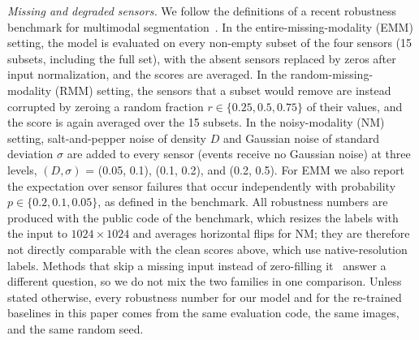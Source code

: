 \emph{Missing and degraded sensors.} We follow the definitions of a recent robustness benchmark for multimodal segmentation~\cite{mmssbench2025}. In the entire-missing-modality (EMM) setting, the model is evaluated on every non-empty subset of the four sensors (15 subsets, including the full set), with the absent sensors replaced by zeros after input normalization, and the scores are averaged. In the random-missing-modality (RMM) setting, the sensors that a subset would remove are instead corrupted by zeroing a random fraction $r\in\{0.25, 0.5, 0.75\}$ of their values, and the score is again averaged over the 15 subsets. In the noisy-modality (NM) setting, salt-and-pepper noise of density $D$ and Gaussian noise of standard deviation $\sigma$ are added to every sensor (events receive no Gaussian noise) at three levels, $(D,\sigma)$ = (0.05, 0.1), (0.1, 0.2), and (0.2, 0.5). For EMM we also report the expectation over sensor failures that occur independently with probability $p\in\{0.2, 0.1, 0.05\}$, as defined in the benchmark. All robustness numbers are produced with the public code of the benchmark, which resizes the labels with the input to $1024\times1024$ and averages horizontal flips for NM; they are therefore not directly comparable with the clean scores above, which use native-resolution labels.
Methods that skip a missing input instead of zero-filling it~\cite{anyseg2024,rmmss2025,fuseadapt2026} answer a different question, so we do not mix the two families in one comparison. Unless stated otherwise, every robustness number for our model and for the re-trained baselines in this paper comes from the same evaluation code, the same images, and the same random seed.

